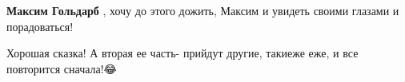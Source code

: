 \begin{itemize}
\begin{itemize}
 
\textbf{Максим Гольдарб} , хочу до этого дожить, Максим и увидеть своими глазами и порадоваться!
\end{itemize}

 
Хорошая сказка! А вторая ее часть- прийдут другие, такиеже еже, и все повторится сначала!😂

\end{itemize}

